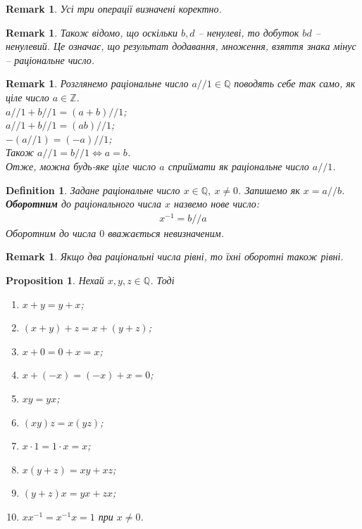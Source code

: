 \documentclass[a4paper, 14pt]{extarticle}
\theoremstyle{theoremdd}
\theoremstyle{theoremdd}
\newtheorem{definition}[theorem]{Definition}
\theoremstyle{theoremdd}
\theoremstyle{theoremdd}
\theoremstyle{theoremdd}
\theoremstyle{theoremdd}
\theoremstyle{theoremdd}
\theoremstyle{theoremdd}
\theoremstyle{theoremdd}
\theoremstyle{theoremdd}
\newtheorem{proposition}[theorem]{Proposition}
\theoremstyle{theoremdd}
\theoremstyle{theoremdd}
\newtheorem{remark}[theorem]{Remark}
\theoremstyle{theoremdd}
\theoremstyle{theoremdd}
\theoremstyle{theoremdd}
\theoremstyle{theoremdd}
\begin{document}
\begin{remark}
Усі три операції визначені коректно.
\end{remark}

\begin{remark}
Також відомо, що оскільки $b,d$ -- ненулеві, то добуток $bd$ -- ненулевий. Це означає, що результат додавання, множення, взяття знака мінус -- раціональне число.
\end{remark}

\begin{remark}
Розглянемо раціональне число $a//1 \in \mathbb{Q}$ поводять себе так само, як ціле число $a \in \mathbb{Z}$.\\
$a//1 + b//1 = (a+b)//1$;\\
$a//1 + b//1 = (ab)//1$;\\
$-(a//1) = (-a)//1$;\\
Також $a//1 = b//1 \iff a = b$.\\
Отже, можна будь-яке ціле число $a$ сприймати як раціональне число $a//1$.
\end{remark}

\begin{definition}
Задане раціональне число $x \in \mathbb{Q},\ x \neq 0$. Запишемо як $x = a//b$.\\
\textbf{Оборотним} до раціонального числа $x$ назвемо нове число:
\begin{align*}
x^{-1} = b//a
\end{align*}
Оборотним до числа $0$ вважається невизначеним.
\end{definition}

\begin{remark}
Якщо два раціональні числа рівні, то їхні оборотні також рівні.
\end{remark}

\begin{proposition}
Нехай $x,y,z \in \mathbb{Q}$. Тоді
\begin{enumerate}[nosep,wide=0pt,label={\arabic*)}]
\item $x+y = y+x$;
\item $(x+y) + z = x+(y+z)$;
\item $x+0 = 0+x = x$;
\item $x+(-x) = (-x)+x = 0$;
\item $xy = yx$;
\item $(xy)z = x(yz)$;
\item $x \cdot 1 = 1 \cdot x = x$;
\item $x(y+z) = xy + xz$;
\item $(y+z)x = yx + zx$;
\item $xx^{-1} = x^{-1}x = 1$ при $x \neq 0$.
\end{enumerate}
\end{proposition}
\end{document}
